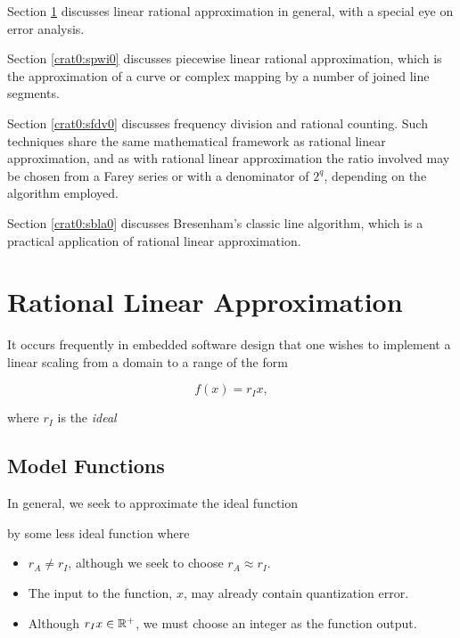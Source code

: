 Section \ref{crat0:srla0} discusses linear rational approximation
in general, with a special eye on error analysis.

Section \ref{crat0:spwi0} discusses piecewise linear rational approximation,
which is the approximation of a curve or complex mapping by a 
number of joined line segments.

Section \ref{crat0:sfdv0} discusses frequency division and rational counting.
Such techniques share the same mathematical framework as rational linear
approximation, and as with rational linear approximation the ratio
involved may be chosen from a Farey series or with a denominator of $2^q$, depending
on the algorithm employed.

Section \ref{crat0:sbla0} discusses Bresenham's classic line algorithm,
which is a practical application of rational linear approximation.

\section{Rational Linear Approximation}
\label{crat0:srla0}

It occurs frequently in embedded software design that one wishes to
implement a linear scaling from a domain to a range of the form

\begin{equation}
\label{eq:crat0:srla0:01}
f(x) = r_I x ,
\end{equation}

\noindent{}where $r_I$ is the \emph{ideal}


\subsection{Model Functions}
\label{crat0:srla0:smfu0}

In general, we seek to approximate the ideal function


\noindent{}by some less ideal function where

\begin{itemize}
\item $r_A \neq r_I$, although we seek to choose $r_A \approx r_I$.
\item The input to the function, $x$, may already contain
      quantization error.
\item Although $r_I x \in {\mathbb{R}^+}$, we must choose
      an integer as the function output. 
\end{itemize}

